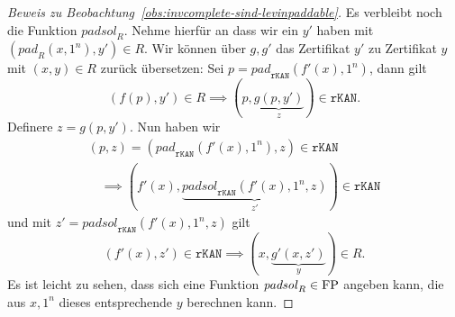 \begin{proof}[Beweis zu Beobachtung~\ref{obs:invcomplete-sind-levinpaddable}]
    Es verbleibt noch die Funktion $\mathit{padsol}_R$. Nehme hierfür an dass wir ein $y'$ haben mit $(\mathit{pad}_R(x, 1^n), y')\in R$.
    Wir können über $g, g'$ das Zertifikat $y'$ zu Zertifikat $y$ mit $(x, y)\in R$ zurück übersetzen:
    Sei $p=\mathit{pad}_\mathtt{rKAN}(f'(x), 1^n)$, dann gilt
    \[ (f(p), y')\in R \implies (p, \underbrace{g(p, y')}_z)\in \mathtt{rKAN}. \]
    Definere $z=g(p, y')$.
    Nun haben wir
    \begin{gather*} (p, z)=(\mathit{pad}_\mathtt{rKAN}(f'(x), 1^n), z)\in\mathtt{rKAN}  \\\quad\implies (f'(x), \underbrace{\mathit{padsol}_\mathtt{rKAN}(f'(x), 1^n, z)}_{z'})\in\mathtt{rKAN} \end{gather*}
    und mit $z'=\mathit{padsol}_\mathtt{rKAN}(f'(x), 1^n, z)$ gilt
    \[ (f'(x), z') \in \mathtt{rKAN} \implies (x, \underbrace{g'(x, z')}_{y}) \in R. \]
    Es ist leicht zu sehen, dass sich eine Funktion $\mathit{padsol}_R\in\mathrm{FP}$ angeben kann, die aus $x, 1^n$ dieses entsprechende $y$ berechnen kann.
\end{proof}

